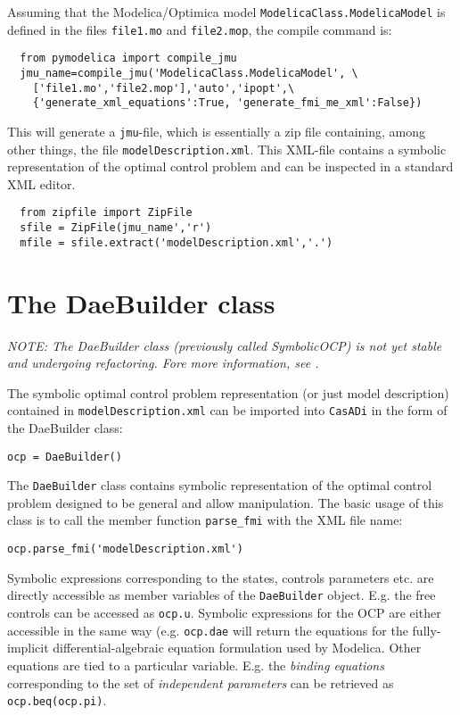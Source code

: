 \documentclass[a4paper,12pt]{book}
\newcommand{\CasADi}{\texttt{CasADi}\xspace}
\begin{document}
Assuming that the Modelica/Optimica model \texttt{ModelicaClass.ModelicaModel} is defined in the files \texttt{file1.mo} and \texttt{file2.mop}, the compile command is:
\begin{verbatim}
  from pymodelica import compile_jmu
  jmu_name=compile_jmu('ModelicaClass.ModelicaModel', \
    ['file1.mo','file2.mop'],'auto','ipopt',\
    {'generate_xml_equations':True, 'generate_fmi_me_xml':False})
\end{verbatim}

This will generate a \texttt{jmu}-file, which is essentially a zip file containing, among other things, the file \texttt{modelDescription.xml}. This XML-file contains a symbolic representation of the optimal control problem and can be inspected in a standard XML editor.
\begin{verbatim}
  from zipfile import ZipFile
  sfile = ZipFile(jmu_name','r')
  mfile = sfile.extract('modelDescription.xml','.')
\end{verbatim}

\section{The DaeBuilder class} \label{sec:modelica_import}
\emph{NOTE: The DaeBuilder class (previously called SymbolicOCP) is not yet stable and undergoing refactoring. Fore more information, see .}

The symbolic optimal control problem representation (or just model description) contained in \texttt{modelDescription.xml} can be imported into \CasADi in the form of the DaeBuilder class:
\begin{verbatim}
ocp = DaeBuilder()
\end{verbatim}

The \texttt{DaeBuilder} class contains symbolic representation of the optimal control problem designed to be general and allow manipulation. The basic usage of this class is to call the member function \texttt{parse\_fmi} with the XML file name:
\begin{verbatim}
ocp.parse_fmi('modelDescription.xml')
\end{verbatim}

Symbolic expressions corresponding to the states, controls parameters etc. are directly accessible as member variables of the \texttt{DaeBuilder} object. E.g. the free controls can be accessed as \verb|ocp.u|. Symbolic expressions for the OCP are either accessible in the same way (e.g. \verb|ocp.dae| will return the equations for the fully-implicit differential-algebraic equation formulation used by Modelica. Other equations are tied to a particular variable. E.g. the \emph{binding equations} corresponding to the set of \emph{independent parameters} can be retrieved as \verb|ocp.beq(ocp.pi)|.
\end{document}
